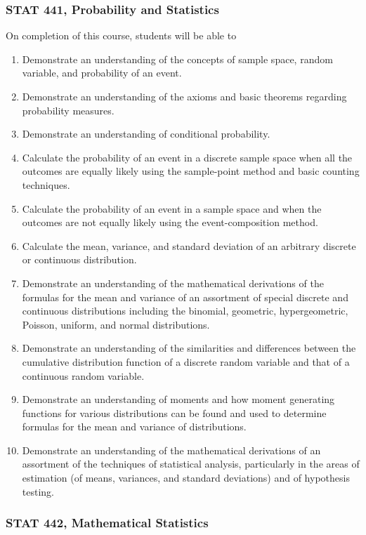 \documentclass[11pt]{article}
\newenvironment{alphalist}{
\begin{enumerate}[label=(\arabic*),widest=107 ,leftmargin=25pt, itemsep=0pt]}
{\end{enumerate}}
\begin{document}
\subsubsection{STAT 441, Probability and Statistics}

On completion of this course, students will be able to
\begin{alphalist}
	\item Demonstrate an understanding of the concepts of sample space, random variable, and probability of an event.
	\item Demonstrate an understanding of the axioms and basic theorems regarding probability measures.
	\item Demonstrate an understanding of conditional probability.
	\item Calculate the probability of an event in a discrete sample space when all the outcomes are equally likely using the sample-point method and basic counting techniques.
	\item Calculate the probability of an event in a sample space and when the outcomes are not equally likely using the event-composition method.
	\item Calculate the mean, variance, and standard deviation of an arbitrary discrete or continuous distribution.
	\item Demonstrate an understanding of the mathematical derivations of the formulas for the mean and variance of an assortment of special discrete and continuous distributions including the binomial, geometric, hypergeometric, Poisson, uniform, and normal distributions.
	\item Demonstrate an understanding of the similarities and differences between the cumulative distribution function of a discrete random variable and that of a continuous random variable.
	\item Demonstrate an understanding of moments and how moment generating functions for various distributions can be found and used to determine formulas for the mean and variance of distributions.
	\item Demonstrate an understanding of the mathematical derivations of an assortment of the techniques of statistical analysis, particularly in the areas of estimation (of means, variances, and standard deviations) and of hypothesis testing.
\end{alphalist}
\subsubsection{STAT 442, Mathematical Statistics}
\end{document}
